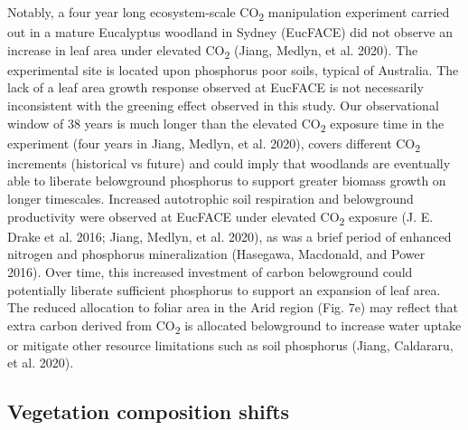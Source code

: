 \documentclass[
]{article}
\begin{document}
Notably, a four year long ecosystem-scale CO\textsubscript{2}
manipulation experiment carried out in a mature Eucalyptus woodland in
Sydney (EucFACE) did not observe an increase in leaf area under elevated
CO\textsubscript{2} (Jiang, Medlyn, et al. 2020). The experimental site
is located upon phosphorus poor soils, typical of Australia. The lack of
a leaf area growth response observed at EucFACE is not necessarily
inconsistent with the greening effect observed in this study. Our
observational window of 38 years is much longer than the elevated
CO\textsubscript{2} exposure time in the experiment (four years in
Jiang, Medlyn, et al. 2020), covers different CO\textsubscript{2}
increments (historical vs future) and could imply that woodlands are
eventually able to liberate belowground phosphorus to support greater
biomass growth on longer timescales. Increased autotrophic soil
respiration and belowground productivity were observed at EucFACE under
elevated CO\textsubscript{2} exposure (J. E. Drake et al. 2016; Jiang,
Medlyn, et al. 2020), as was a brief period of enhanced nitrogen and
phosphorus mineralization (Hasegawa, Macdonald, and Power 2016). Over
time, this increased investment of carbon belowground could potentially
liberate sufficient phosphorus to support an expansion of leaf area. The
reduced allocation to foliar area in the Arid region (Fig. 7e) may
reflect that extra carbon derived from CO\textsubscript{2} is allocated
belowground to increase water uptake or mitigate other resource
limitations such as soil phosphorus (Jiang, Caldararu, et al. 2020).

\hypertarget{vegetation-composition-shifts}{%
\subsection{Vegetation composition
shifts}\label{vegetation-composition-shifts}}
\end{document}
